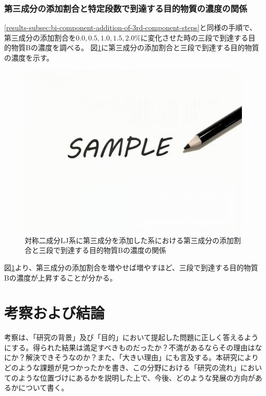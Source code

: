 \documentclass[titlepage]{jsreport}
\begin{document}
\subsection{第三成分の添加割合と特定段数で到達する目的物質の濃度の関係} \label{results-subsec:bi-component-addition-of-3rd-component-addition-ratio-steps}
\ref{results-subsec:bi-component-addition-of-3rd-component-steps}と同様の手順で、第三成分の添加割合を$0.0,0.5,1.0,1.5,2.0\%$に変化させた時の三段で到達する目的物質Bの濃度を調べる。
図\ref{fig:bi-component-addition-of-3rd-component-addition-ratio-steps}に第三成分の添加割合と三段で到達する目的物質の濃度を示す。

\begin{figure}[htbp]
    \begin{center}
        \includegraphics[width=14cm]{fig/sample.jpeg}
    \end{center}
    \caption{対称二成分LJ系に第三成分を添加した系における第三成分の添加割合と三段で到達する目的物質Bの濃度の関係}
    \label{fig:bi-component-addition-of-3rd-component-addition-ratio-steps}
\end{figure}

\newpage
図\ref{fig:bi-component-addition-of-3rd-component-addition-ratio-steps}より、第三成分の添加割合を増やせば増やすほど、三段で到達する目的物質Bの濃度が上昇することが分かる。


\chapter{考察および結論} \label{chap:summary}

考察は、「研究の背景」及び「目的」において提起した問題に正しく答えるようにする。得られた結果は満足すべきものだったか？不満があるならその理由はなにか？解決できそうなのか？また、「大きい理由」にも言及する。本研究によりどのような課題が見つかったかを書き、この分野における「研究の流れ」においてのような位置づけにあるかを説明した上で、今後、どのような発展の方向があるかについて書く。
\end{document}
